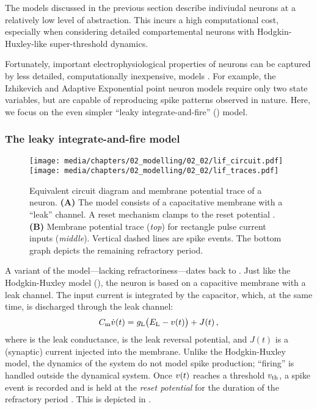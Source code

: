 The models discussed in the previous section describe indiviudal neurons at a relatively low level of abstraction.
This incurs a high computational cost, especially when considering detailed compartemental neurons with Hodgkin-Huxley-like super-threshold dynamics.

Fortunately, important electrophysiological properties of neurons can be captured by less detailed, computationally inexpensive, models \citep[cf.][Chapter~14]{koch1999biophysics}.
For example, the Izhikevich \citep{izhikevich2004which} and Adaptive Exponential \citep{brette2005adaptive} point neuron models require only two state variables, but are capable of reproducing spike patterns observed in nature.
Here, we focus on the even simpler \enquote{leaky integrate-and-fire} (\LIF) model.

\subsubsection{The leaky integrate-and-fire model}

\begin{figure}[t]
	\texttt{[image: media/chapters/02\_modelling/02\_02/lif\_circuit.pdf]}%
	\kern-0.25cm\texttt{[image: media/chapters/02\_modelling/02\_02/lif\_traces.pdf]}
	\caption[Equivalent circuit diagram and membrane potential trace of a LIF neuron]{Equivalent circuit diagram and membrane potential trace of a \LIF neuron. \textbf{(A)} The \LIF model consists of a capacitative membrane with a \enquote{leak} channel. A reset mechanism clamps \vMem to the reset potential \vReset. \textbf{(B)} Membrane potential trace (\emph{top}) for rectangle pulse current inputs (\emph{middle}).  Vertical dashed lines are spike events. The bottom graph depicts the remaining refractory period.}
	\label{fig:lif}
\end{figure}

A variant of the \LIF model---lacking refractoriness---dates back to \citet{lapicque1907recherches}.
Just like the Hodgkin-Huxley model (), the \LIF neuron is based on a capacitive membrane with a leak channel.
The input current is integrated by the capacitor, which, at the same time, is discharged through the leak channel:
\begin{align}
	C_\mathrm{m} \dot{{v}}(t) =
		g_\mathrm{L} \bigl(E_\mathrm{L} - {v}(t)\bigr) + J(t) \,,
	\label{eqn:lif}
\end{align}
where \gL is the leak conductance, \EL is the leak reversal potential, and $J(t)$ is a (synaptic) current injected into the membrane.
Unlike the Hodgkin-Huxley model, the dynamics of the system do not model spike production; \enquote{firing} is handled outside the dynamical system. 
Once ${v}(t)$ reaches a threshold $v_\mathrm{th}$, a spike event is recorded and \vMem is held at the \emph{reset potential} \vReset for the duration of the refractory period \tauRef.
This is depicted in .

